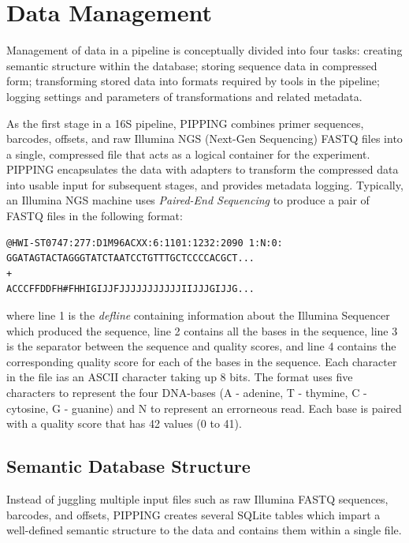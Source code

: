 \documentclass[12pt]{article}
\begin{document}
	\section{Data Management} %
	\label{sec:data_management}
	Management of data in a pipeline is conceptually divided into four tasks: 
	creating semantic structure within the database; storing sequence data in compressed form;
	transforming stored data into formats required by tools in the pipeline; logging
	settings and parameters of transformations and related metadata.
	
	As the first stage in a 16S pipeline, PIPPING combines primer sequences, barcodes, 
	offsets, and raw Illumina NGS (Next-Gen Sequencing) FASTQ files into a single, 
	compressed file that acts as a logical container for the experiment. PIPPING 
	encapsulates the data with adapters to transform the compressed data into 
	usable input for subsequent stages, and provides metadata logging. Typically, 
	an Illumina NGS machine uses \emph{Paired-End Sequencing}\cite{paired-end} to produce a pair of FASTQ files
	in the following format:

	\singlespacing
	\begin{verbatim}
@HWI-ST0747:277:D1M96ACXX:6:1101:1232:2090 1:N:0:
GGATAGTACTAGGGTATCTAATCCTGTTTGCTCCCCACGCT...
+
ACCCFFDDFH#FHHIGIJJFJJJJJJJJJJJIIJJJGIJJG...
	\end{verbatim}
	\doublespacing
	where line 1 is the \emph{defline} containing information about the Illumina
	Sequencer which produced the sequence, line 2 contains all the bases in the 
	sequence, line 3 is the separator between the sequence and quality scores, and 
	line 4 contains the corresponding quality score for each of the bases in the 
	sequence. Each character in the file ias an ASCII character taking up 8 bits. 
	The format uses five characters to represent the four DNA-bases (A - adenine, T - thymine,
	C - cytosine, G - guanine) and N to represent an errorneous read. Each base is paired
	with a quality score that has 42 values (0 to 41).

	\subsection{Semantic Database Structure} %
	\label{sub:semantic_database_structure}
	Instead of juggling multiple input files such as raw Illumina FASTQ sequences,
	barcodes, and offsets, PIPPING creates several SQLite tables which impart a well-defined
	semantic structure to the data and contains them within a single file.
	
\end{document}
